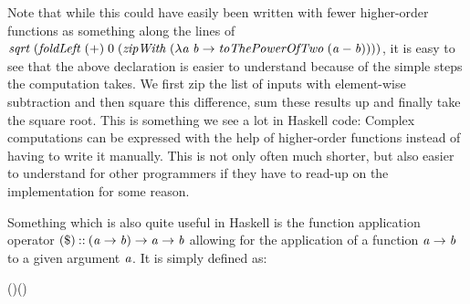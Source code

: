 \documentclass[paper=A4,twoside=true,openright,parskip=full,chapterprefix=true,headings=normal,bibliography=totoc,listof=totoc,titlepage=on,captions=tableabove,draft=false,british]{scrreprt}%
\begin{document}
\resethooks
\vspace{-2\baselineskip}

Note that while this could have easily been written with fewer
higher-order functions as something along the lines of
\ensuremath{\Varid{sqrt}\;(\Varid{foldLeft}\;(\mathbin{+})\;\mathrm{0}\;(\Varid{zipWith}\;(\lambda \Varid{a}\;\Varid{b}\to \Varid{toThePowerOfTwo}\;(\Varid{a}\mathbin{-}\Varid{b}))))}, it
is easy to see that the above declaration is easier to understand
because of the simple steps the computation takes. We first zip the list
of inputs with element-wise subtraction and then square this difference,
sum these results up and finally take the square root. This is something
we see a lot in Haskell code: Complex computations can be expressed with
the help of higher-order functions instead of having to write it
manually. This is not only often much shorter, but also easier to
understand for other programmers if they have to read-up on the
implementation for some reason.

Something which is also quite useful in Haskell is the function
application operator \ensuremath{(\mathbin{\$})\mathbin{::}(\Varid{a}\to \Varid{b})\to \Varid{a}\to \Varid{b}} allowing for the
application of a function \ensuremath{\Varid{a}\to \Varid{b}} to a given argument \ensuremath{\Varid{a}}. It is simply
defined as:


\begin{hscode}\SaveRestoreHook
{}%
%
\>[B]{}(\mathbin{\$})\mathbin{::}(\to {})\to {}\to {}\<[E]%
\\
\>[B]{}\mathbin{\$}\mathrel{=}\;\<[E]%
\ColumnHook
\end{hscode}\resethooks
\vspace{-2\baselineskip}
\end{document}
